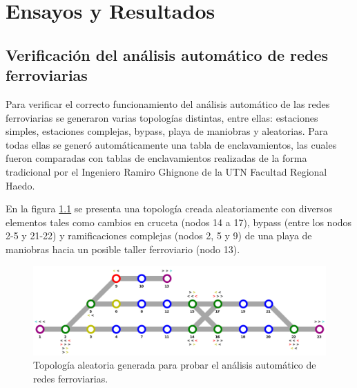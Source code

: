 
\chapter{Ensayos y Resultados} %

\label{Chapter4} %




\section{Verificación del análisis automático de redes ferroviarias}
	
	Para verificar el correcto funcionamiento del análisis automático de las redes ferroviarias se generaron varias topologías distintas, entre ellas: estaciones simples, estaciones complejas, bypass, playa de maniobras y aleatorias. Para todas ellas se generó automáticamente una tabla de enclavamientos, las cuales fueron comparadas con tablas de enclavamientos realizadas de la forma tradicional por el Ingeniero Ramiro Ghignone de la UTN Facultad Regional Haedo.
	
	En la figura \ref{fig:Mapa_0} se presenta una topología creada aleatoriamente con diversos elementos tales como cambios en cruceta (nodos 14 a 17), bypass (entre los nodos 2-5 y 21-22) y ramificaciones complejas (nodos 2, 5 y 9) de una playa de maniobras hacia un posible taller ferroviario (nodo 13).
	
	\begin{figure}[h]
	\centering
	\includegraphics[scale=0.45]{./Figures/Mapa_0}
		\caption{Topología aleatoria generada para probar el análisis automático de redes ferroviarias.}
		\label{fig:Mapa_0}
	\end{figure}
	

